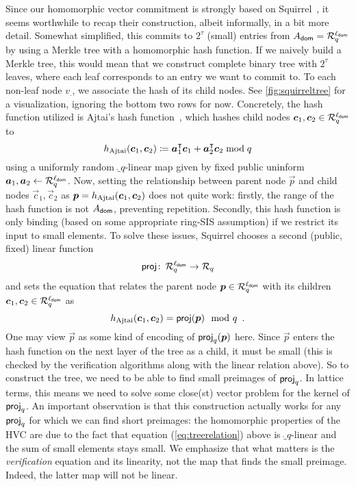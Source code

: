 Since our homomorphic vector commitment is strongly based on Squirrel~\cite{CCS:FleSimZha22}, it seems worthwhile to recap their construction, albeit informally, in a bit more detail.
Somewhat simplified, this commits to $2^\tau$ (small) entries from $A_{\mathsf{dom}} = \mathcal{R}_q^{\ell_{\mathsf{dom}}}$ by using a Merkle tree with a homomorphic hash function.
If we naively build a Merkle tree, this would mean that we construct complete binary tree with $2^\tau$ leaves, where each leaf corresponds to an entry we want to commit to.
To each non-leaf node $v_{.}$, we associate the hash of its child nodes.
See \autoref{fig:squirreltree} for a visualization, ignoring the bottom two rows for now.
Concretely, the hash function utilized is Ajtai's hash function~\cite{ICALP:Ajtai99}, which hashes child nodes $\boldsymbol{c}_1, \boldsymbol{c}_2\in\mathcal{R}_q^{\ell_{\mathsf{dom}}}$ to
\[
h_\mathrm{Ajtai}(\boldsymbol{c}_1,\boldsymbol{c}_2) \coloneqq \boldsymbol{a}_1^\intercal \boldsymbol{c}_1 + \boldsymbol{a}_2^\intercal \boldsymbol{c}_2 \bmod q
\]
using a uniformly random $\ring_q$-linear map given by fixed public uninform $\boldsymbol{a}_1,\boldsymbol{a}_2\gets \mathcal{R}_q^{\ell_{\mathsf{dom}}}$.
Now, setting the relationship between parent node $\vec{p}$ and child nodes $\vec{c}_1, \vec{c}_2$ as $\boldsymbol{p}=h_\mathrm{Ajtai}(\boldsymbol{c}_1,\boldsymbol{c}_2)$ does not quite work: firstly, the range of the hash function is not $A_{\mathsf{dom}}$, preventing repetition. Secondly, this hash function is only binding (based on some appropriate ring-SIS assumption) if we restrict its input to small elements.
To solve these issues, Squirrel chooses a second (public, fixed) linear function 
\[
\mathsf{proj}\colon\,\mathcal{R}_q^{\ell_{\mathsf{dom}}} \to \mathcal{R}_q
\]
and sets the equation that relates the parent node $\boldsymbol{p}\in\mathcal{R}_q^{\ell_{\mathsf{dom}}}$ with its children $\boldsymbol{c}_1,\boldsymbol{c}_2\in\mathcal{R}_q^{\ell_{\mathsf{dom}}}$ as
\begin{equation}
h_\mathrm{Ajtai}(\boldsymbol{c}_1,\boldsymbol{c}_2) = \mathsf{proj}(\boldsymbol{p}) \mod q\enspace. \label{eq:treerelation}
\end{equation}
One may view $\vec{p}$ as some kind of encoding of $\mathsf{proj}_q(\boldsymbol{p})$ here. Since $\vec{p}$ enters the hash function on the next layer of the tree as a child, it must be small (this is checked by the verification algorithms along with the linear relation above).
So to construct the tree, we need to be able to find small preimages of $\mathsf{proj}_q$.
In lattice terms, this means we need to solve some close(st) vector problem for the kernel of $\mathsf{proj}_q$.
An important observation is that this construction actually works for any $\mathsf{proj}_q$ for which we can find short preimages:
the homomorphic properties of the HVC are due to the fact that equation (\ref{eq:treerelation}) above%
is $\ring_q$-linear and the sum of small elements stays small.
We emphasize that what matters is the \emph{verification} equation and its linearity, not the map that finds the small preimage. Indeed, the latter map will not be linear.

